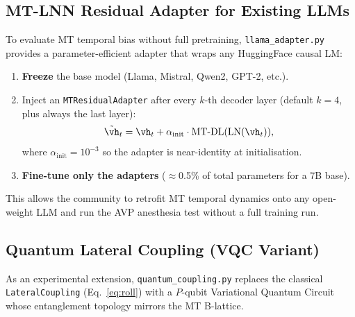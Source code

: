 \subsection{MT-LNN Residual Adapter for Existing LLMs}
\label{sec:adapter}

To evaluate MT temporal bias without full pretraining, \texttt{llama\_adapter.py} provides a parameter-efficient adapter that wraps any HuggingFace causal LM:
\begin{enumerate}[noitemsep]
  \item \textbf{Freeze} the base model (Llama, Mistral, Qwen2, GPT-2, etc.).
  \item Inject an \texttt{MTResidualAdapter} after every $k$-th decoder layer (default $k=4$, plus always the last layer):
  \begin{equation}
    \tilde{\vh}_t = \vh_t + \alpha_\text{init}\cdot\mathrm{MT\text{-}DL}(\mathrm{LN}(\vh_t)),
    \label{eq:adapter}
  \end{equation}
  where $\alpha_\text{init}=10^{-3}$ so the adapter is near-identity at initialisation.
  \item \textbf{Fine-tune only the adapters} ($\approx$0.5\% of total parameters for a 7B base).
\end{enumerate}
This allows the community to retrofit MT temporal dynamics onto any open-weight LLM and run the AVP anesthesia test without a full training run.

\subsection{Quantum Lateral Coupling (VQC Variant)}
\label{sec:quantum}

As an experimental extension, \texttt{quantum\_coupling.py} replaces the classical \texttt{LateralCoupling} (Eq.\ \ref{eq:roll}) with a $P$-qubit Variational Quantum Circuit whose entanglement topology mirrors the MT B-lattice.

